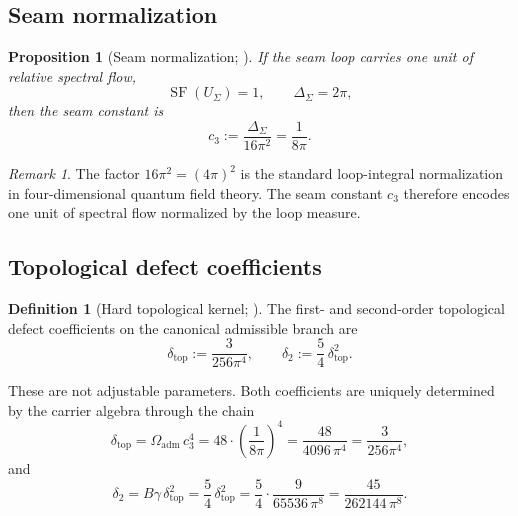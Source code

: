 \documentclass[11pt,a4paper]{article}
\newtheorem{proposition}[theorem]{Proposition}
\theoremstyle{definition}
\newtheorem{definition}[theorem]{Definition}
\theoremstyle{remark}
\newtheorem*{remark}{Remark}
\DeclareMathOperator{\SF}{SF}
\newcommand{\Seam}{\Sigma}
\newcommand{\cthree}{c_3}
\newcommand{\deltatop}{\delta_{\mathrm{top}}}
\newcommand{\gammaY}{\gamma}
\newcommand{\Oadm}{\Omega_{\mathrm{adm}}}
\numberwithin{equation}{section}
\begin{document}
\subsection{Seam normalization}\label{sec:seam-norm}

\begin{proposition}[Seam normalization; {\cite[Proposition~4.1]{TFPTkernel}}]
\label{prop:seam-normalization}
If the seam loop carries one unit of relative spectral flow,
\begin{equation}\label{eq:seam-flow}
\SF(U_{\Seam})=1,
\qquad
\Delta_{\Seam}=2\pi,
\end{equation}
then the seam constant is
\begin{equation}\label{eq:c3}
\cthree:=\frac{\Delta_\Seam}{16\pi^2}=\frac{1}{8\pi}.
\end{equation}
\end{proposition}

\begin{remark}
The factor $16\pi^2=(4\pi)^2$ is the standard loop-integral
normalization in four-dimensional quantum field theory. The seam
constant $\cthree$ therefore encodes one unit of spectral flow
normalized by the loop measure.
\end{remark}

\subsection{Topological defect coefficients}\label{sec:defect-coefficients}

\begin{definition}[Hard topological kernel; {\cite[Eq.~(4.7)]{TFPT31}}]
\label{def:hard-topological-kernel}
The first- and second-order topological defect coefficients on the canonical
admissible branch are
\begin{equation}\label{eq:defects}
\deltatop:=\frac{3}{256\pi^4},
\qquad
\delta_2:=\frac54\,\deltatop^2.
\end{equation}
\end{definition}

These are not adjustable parameters. Both coefficients are uniquely
determined by the carrier algebra through the chain
\begin{equation}\label{eq:defect-chain}
\deltatop
=
\Oadm\,\cthree^4
=
48\cdot\left(\frac{1}{8\pi}\right)^{\!4}
=
\frac{48}{4096\,\pi^4}
=
\frac{3}{256\pi^4},
\end{equation}
and
\begin{equation}\label{eq:delta2-derivation}
\delta_2
=
B\gammaY\,\deltatop^2
=
\frac54\,\deltatop^2
=
\frac{5}{4}\cdot\frac{9}{65536\,\pi^8}
=
\frac{45}{262144\,\pi^8}.
\end{equation}
\end{document}

